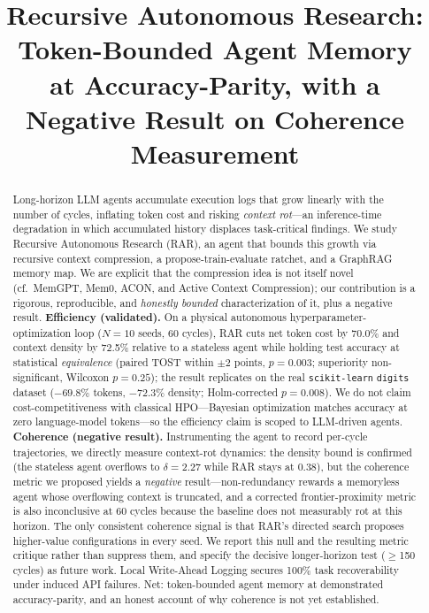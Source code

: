 \documentclass[conference]{IEEEtran}
\begin{document}
\title{Recursive Autonomous Research: Token-Bounded Agent Memory\\ at Accuracy-Parity, with a Negative Result on Coherence Measurement}
\author{
}
\maketitle

\begin{abstract}
Long-horizon LLM agents accumulate execution logs that grow linearly with the number of cycles, inflating token cost and risking \emph{context rot}---an inference-time degradation in which accumulated history displaces task-critical findings. We study Recursive Autonomous Research (RAR), an agent that bounds this growth via recursive context compression, a propose-train-evaluate ratchet, and a GraphRAG memory map. We are explicit that the compression idea is not itself novel (cf.\ MemGPT, Mem0, ACON, and Active Context Compression); our contribution is a rigorous, reproducible, and \emph{honestly bounded} characterization of it, plus a negative result. \textbf{Efficiency (validated).} On a physical autonomous hyperparameter-optimization loop ($N{=}10$ seeds, 60 cycles), RAR cuts net token cost by 70.0\% and context density by 72.5\% relative to a stateless agent while holding test accuracy at statistical \emph{equivalence} (paired TOST within $\pm 2$ points, $p{=}0.003$; superiority non-significant, Wilcoxon $p{=}0.25$); the result replicates on the real \texttt{scikit-learn} \texttt{digits} dataset ($-69.8\%$ tokens, $-72.3\%$ density; Holm-corrected $p{=}0.008$). We do not claim cost-competitiveness with classical HPO---Bayesian optimization matches accuracy at zero language-model tokens---so the efficiency claim is scoped to LLM-driven agents. \textbf{Coherence (negative result).} Instrumenting the agent to record per-cycle trajectories, we directly measure context-rot dynamics: the density bound is confirmed (the stateless agent overflows to $\delta{=}2.27$ while RAR stays at $0.38$), but the coherence metric we proposed yields a \emph{negative} result---non-redundancy rewards a memoryless agent whose overflowing context is truncated, and a corrected frontier-proximity metric is also inconclusive at 60 cycles because the baseline does not measurably rot at this horizon. The only consistent coherence signal is that RAR's directed search proposes higher-value configurations in every seed. We report this null and the resulting metric critique rather than suppress them, and specify the decisive longer-horizon test ($\geq$150 cycles) as future work. Local Write-Ahead Logging secures 100\% task recoverability under induced API failures. Net: token-bounded agent memory at demonstrated accuracy-parity, and an honest account of why coherence is not yet established.
\end{abstract}
\end{document}
